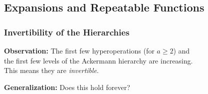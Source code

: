 \subsection{Expansions and Repeatable Functions}

\begin{frame}
\frametitle{Invertibility of the Hierarchies}

\textbf{Observation:} The first few hyperoperations (for $a\ge 2$) and \\ the first few levels of the Ackermann hierarchy are increasing. \\This means they are \emph{invertible}.

\bigskip

\pause 
\textbf{Generalization:} Does this hold forever?

\bigskip

\pause 
{}

%
%
\end{frame}


